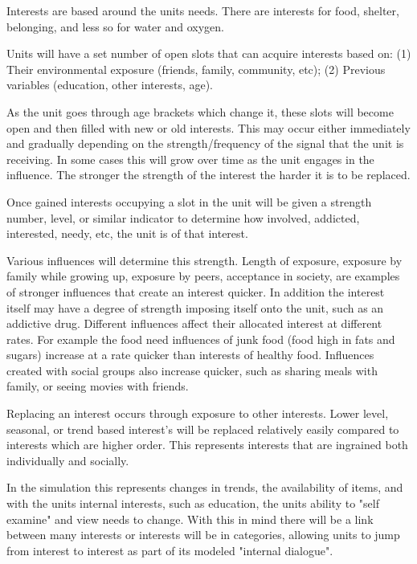 Interests are based around the units needs. There are interests for food, shelter, belonging, and less so for water and oxygen.

Units will have a set number of open slots that can acquire interests based on: (1) Their environmental exposure (friends, family, community, etc); (2) Previous variables (education, other interests, age).


As the unit goes through age brackets which change it, these slots will become open and then filled with new or old interests. This may occur either immediately and gradually depending on the strength/frequency of the signal that the unit is receiving. In some cases this will grow over time as the unit engages in the influence. The stronger the strength of the interest the harder it is to be replaced.

Once gained interests occupying a slot in the unit will be given a strength number, level, or similar indicator to determine how involved, addicted, interested, needy, etc, the unit is of that interest. 

Various influences will determine this strength. Length of exposure, exposure by family while growing up, exposure by peers, acceptance in society, are examples of stronger influences that create an interest quicker. In addition the interest itself may have a degree of strength imposing itself onto the unit, such as an addictive drug. Different influences affect their allocated interest at different rates. For example the food need influences of junk food (food high in fats and sugars) increase at a rate quicker than interests of healthy food. Influences created with social groups also increase quicker, such as sharing meals with family, or seeing movies with friends.


Replacing an interest occurs through exposure to other interests. Lower level, seasonal, or trend based interest's will be replaced relatively easily compared to interests which are higher order. This represents interests that are ingrained both individually and socially. 

In the simulation this represents changes in trends, the availability of items, and with the units internal interests, such as education, the units ability to "self examine" and view needs to change. With this in mind there will be a link between many interests or interests will be in categories, allowing units to jump from interest to interest as part of its modeled "internal dialogue".

